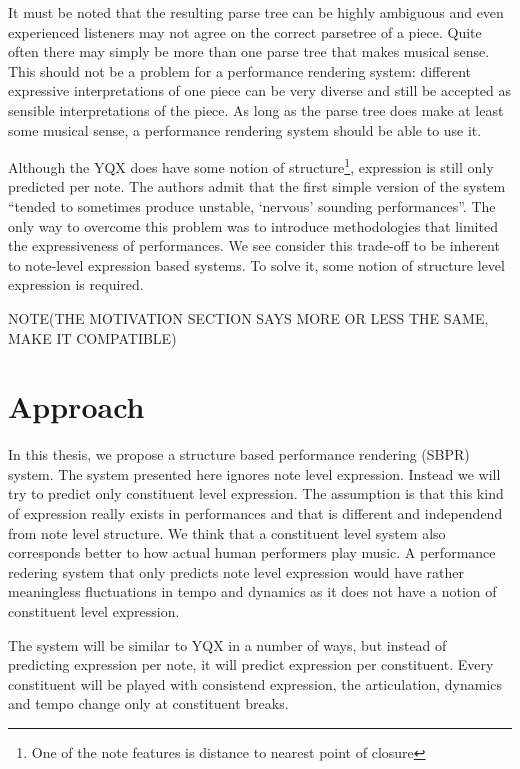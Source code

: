 \documentclass[a4paper,10pt]{article}
\begin{document}
It must be noted that the resulting parse tree can be highly ambiguous and even experienced listeners may not agree on the correct parsetree of a piece. Quite often there may simply be more than one parse tree that makes musical sense. This should not be a problem for a performance rendering system: different expressive interpretations of one piece can be very diverse and still be accepted as sensible interpretations of the piece. As long as the parse tree does make at least some musical sense, a performance rendering system should be able to use it.

Although the YQX does have some notion of structure\footnote{One of the note features is distance to nearest point of closure}, expression is still only predicted per note. The authors admit that the first simple version of the system ``tended to sometimes produce unstable, `nervous' sounding performances''. The only way to overcome this problem was to introduce methodologies that limited the expressiveness of performances. We see consider this trade-off to be inherent to note-level expression based systems. To solve it, some notion of structure level expression is required.

NOTE(THE MOTIVATION SECTION SAYS MORE OR LESS THE SAME, MAKE IT COMPATIBLE)

\section{Approach}


In this thesis, we propose a structure based performance rendering (SBPR) system. The system presented here ignores note level expression. Instead we will try to predict only constituent level expression. The assumption is that this kind of expression really exists in performances and that is different and independend from note level structure. We think that a constituent level system also corresponds better to how actual human performers play music. A performance redering system that only predicts note level expression would have rather meaningless fluctuations in tempo and dynamics as it does not have a notion of constituent level expression.


The system will be similar to YQX in a number of ways, but instead of predicting expression per note, it will predict expression per constituent. Every constituent will be played with consistend expression, the articulation, dynamics and tempo change only at constituent breaks.
\end{document}
